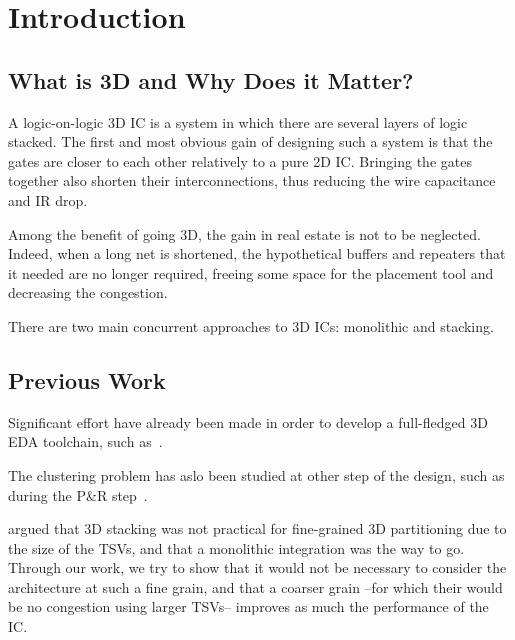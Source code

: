 \documentclass[conference]{IEEEtran}
\begin{document}



\section{Introduction}


\subsection{What is 3D and Why Does it Matter?}

A logic-on-logic 3D IC is a system in which there are several layers of logic stacked.
The first and most obvious gain of designing such a system is that the gates are closer to each other relatively to a pure 2D IC.
Bringing the gates together also shorten their interconnections, thus reducing the wire capacitance and IR drop.

Among the benefit of going 3D, the gain in real estate is not to be neglected.
Indeed, when a long net is shortened, the hypothetical buffers and repeaters that it needed are no longer required, freeing some space for the placement tool and decreasing the congestion.

There are two main concurrent approaches to 3D ICs: monolithic and stacking.


\subsection{Previous Work}
Significant effort have already been made in order to develop a full-fledged 3D EDA toolchain, such as~\cite{Chang2016}. %

The clustering problem has aslo been studied at other step of the design, such as during the P\&R step~\cite{Moura2017}. %

\cite{Samal2017} argued that 3D stacking was not practical for fine-grained 3D partitioning due to the size of the TSVs, and that a monolithic integration was the way to go.
Through our work, we try to show that it would not be necessary to consider the architecture at such a fine grain, and that a coarser grain --for which their would be no congestion using larger TSVs-- improves as much the performance of the IC.
\end{document}
